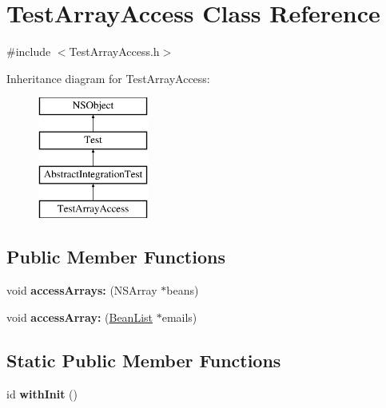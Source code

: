 \hypertarget{interface_test_array_access}{
\section{\-Test\-Array\-Access \-Class \-Reference}
\label{interface_test_array_access}
}


{\ttfamily \#include $<$\-Test\-Array\-Access.\-h$>$}

\-Inheritance diagram for \-Test\-Array\-Access\-:\begin{figure}[H]
\begin{center}
\leavevmode
\includegraphics[height=4.000000cm]{interface_test_array_access}
\end{center}
\end{figure}
\subsection*{\-Public \-Member \-Functions}
\begin{DoxyCompactItemize}
\item 
\hypertarget{interface_test_array_access_a5b3387e7c5178e2c31155dfe57c894e7}{
void {\bfseries access\-Arrays\-:} (\-N\-S\-Array $\ast$beans)}
\label{interface_test_array_access_a5b3387e7c5178e2c31155dfe57c894e7}

\item 
\hypertarget{interface_test_array_access_a1e0082115f157d51a1989ad0b20d6c1e}{
void {\bfseries access\-Array\-:} (\hyperlink{interface_bean_list}{\-Bean\-List} $\ast$emails)}
\label{interface_test_array_access_a1e0082115f157d51a1989ad0b20d6c1e}

\end{DoxyCompactItemize}
\subsection*{\-Static \-Public \-Member \-Functions}
\begin{DoxyCompactItemize}
\item 
\hypertarget{interface_test_array_access_a9aa1abfc7e58be60e5abd2f380426311}{
id {\bfseries with\-Init} ()}
\label{interface_test_array_access_a9aa1abfc7e58be60e5abd2f380426311}

\end{DoxyCompactItemize}


